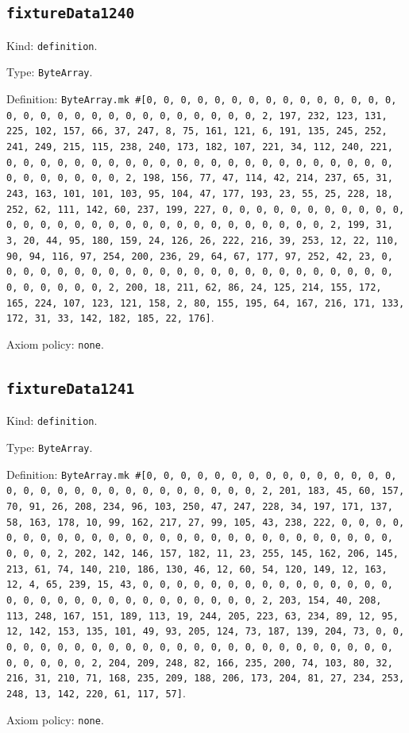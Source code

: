 \documentclass[11pt]{article}
\begin{document}
\subsection*{\texttt{fixtureData1240}}
\noindent Kind: \texttt{definition}.\par
\noindent Type: \texttt{ByteArray}.\par
\noindent Definition: \texttt{ByteArray.mk \#[0, 0, 0, 0, 0, 0, 0, 0, 0, 0, 0, 0, 0, 0, 0, 0, 0, 0, 0, 0, 0, 0, 0, 0, 0, 0, 0, 0, 0, 0, 2, 197, 232, 123, 131, 225, 102, 157, 66, 37, 247, 8, 75, 161, 121, 6, 191, 135, 245, 252, 241, 249, 215, 115, 238, 240, 173, 182, 107, 221, 34, 112, 240, 221, 0, 0, 0, 0, 0, 0, 0, 0, 0, 0, 0, 0, 0, 0, 0, 0, 0, 0, 0, 0, 0, 0, 0, 0, 0, 0, 0, 0, 0, 0, 2, 198, 156, 77, 47, 114, 42, 214, 237, 65, 31, 243, 163, 101, 101, 103, 95, 104, 47, 177, 193, 23, 55, 25, 228, 18, 252, 62, 111, 142, 60, 237, 199, 227, 0, 0, 0, 0, 0, 0, 0, 0, 0, 0, 0, 0, 0, 0, 0, 0, 0, 0, 0, 0, 0, 0, 0, 0, 0, 0, 0, 0, 0, 0, 2, 199, 31, 3, 20, 44, 95, 180, 159, 24, 126, 26, 222, 216, 39, 253, 12, 22, 110, 90, 94, 116, 97, 254, 200, 236, 29, 64, 67, 177, 97, 252, 42, 23, 0, 0, 0, 0, 0, 0, 0, 0, 0, 0, 0, 0, 0, 0, 0, 0, 0, 0, 0, 0, 0, 0, 0, 0, 0, 0, 0, 0, 0, 0, 2, 200, 18, 211, 62, 86, 24, 125, 214, 155, 172, 165, 224, 107, 123, 121, 158, 2, 80, 155, 195, 64, 167, 216, 171, 133, 172, 31, 33, 142, 182, 185, 22, 176]}.\par
\noindent Axiom policy: \texttt{none}.\par
\subsection*{\texttt{fixtureData1241}}
\noindent Kind: \texttt{definition}.\par
\noindent Type: \texttt{ByteArray}.\par
\noindent Definition: \texttt{ByteArray.mk \#[0, 0, 0, 0, 0, 0, 0, 0, 0, 0, 0, 0, 0, 0, 0, 0, 0, 0, 0, 0, 0, 0, 0, 0, 0, 0, 0, 0, 0, 0, 2, 201, 183, 45, 60, 157, 70, 91, 26, 208, 234, 96, 103, 250, 47, 247, 228, 34, 197, 171, 137, 58, 163, 178, 10, 99, 162, 217, 27, 99, 105, 43, 238, 222, 0, 0, 0, 0, 0, 0, 0, 0, 0, 0, 0, 0, 0, 0, 0, 0, 0, 0, 0, 0, 0, 0, 0, 0, 0, 0, 0, 0, 0, 0, 2, 202, 142, 146, 157, 182, 11, 23, 255, 145, 162, 206, 145, 213, 61, 74, 140, 210, 186, 130, 46, 12, 60, 54, 120, 149, 12, 163, 12, 4, 65, 239, 15, 43, 0, 0, 0, 0, 0, 0, 0, 0, 0, 0, 0, 0, 0, 0, 0, 0, 0, 0, 0, 0, 0, 0, 0, 0, 0, 0, 0, 0, 0, 0, 2, 203, 154, 40, 208, 113, 248, 167, 151, 189, 113, 19, 244, 205, 223, 63, 234, 89, 12, 95, 12, 142, 153, 135, 101, 49, 93, 205, 124, 73, 187, 139, 204, 73, 0, 0, 0, 0, 0, 0, 0, 0, 0, 0, 0, 0, 0, 0, 0, 0, 0, 0, 0, 0, 0, 0, 0, 0, 0, 0, 0, 0, 0, 0, 2, 204, 209, 248, 82, 166, 235, 200, 74, 103, 80, 32, 216, 31, 210, 71, 168, 235, 209, 188, 206, 173, 204, 81, 27, 234, 253, 248, 13, 142, 220, 61, 117, 57]}.\par
\noindent Axiom policy: \texttt{none}.\par
\end{document}
